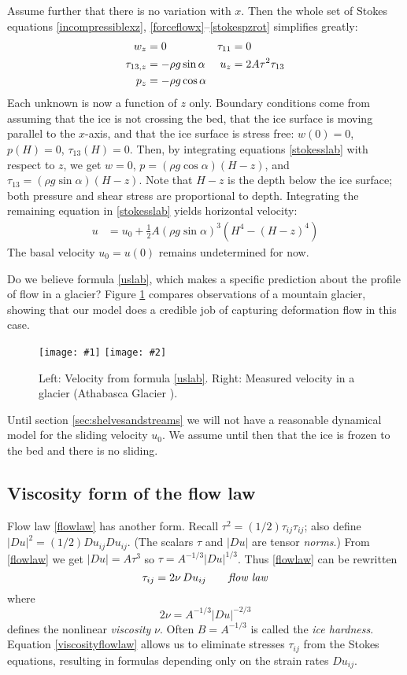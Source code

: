 \documentclass[letterpaper,final,12pt,reqno]{amsart}
\newcommand{\twofigsizes}[5]{
\begin{figure}[ht]
\centering
\texttt{[image: \#1]} \quad
\texttt{[image: \#2]}
\caption{#3}
\label{fig:#1}
\end{figure}}
\begin{document}
Assume further that there is no variation with $x$. Then the whole set of Stokes equations \eqref{incompressiblexz}, \eqref{forceflowx}--\eqref{stokespzrot} simplifies greatly:
\begin{align}
w_z &= 0 &   \tau_{11} &= 0 \label{stokesslab} \\
\tau_{13,z} &= - \rho g \sin\alpha &   u_z &= 2 A \tau^2 \tau_{13} \notag \\
p_z &= - \rho g \cos\alpha \notag
\end{align}
Each unknown is now a function of $z$ only.  Boundary conditions come from assuming that the ice is not crossing the bed, that the ice surface is moving parallel to the $x$-axis, and that the ice surface is stress free: $w(0)=0$, $p(H)=0$, $\tau_{13}(H)=0$.  Then, by integrating equations \eqref{stokesslab} with respect to $z$, we get $w=0$, $p = (\rho g \cos\alpha) (H-z)$, and $\tau_{13} = (\rho g \sin\alpha) (H-z)$.  Note that $H-z$ is the depth below the ice surface; both pressure and shear stress are proportional to depth.  Integrating the remaining equation in \eqref{stokesslab} yields horizontal velocity:
\begin{align}
u &= u_0 + \frac{1}{2} A (\rho g \sin\alpha)^3  \left(H^4 - (H-z)^4\right)  \label{uslab}
\end{align}
The basal velocity $u_0=u(0)$ remains undetermined for now.

Do we believe formula \eqref{uslab}, which makes a specific prediction about the profile of flow in a glacier?  Figure \ref{fig:slabvel} compares observations of a mountain glacier, showing that our model does a credible job of capturing deformation flow in this case.

\twofigsizes{slabvel}{athabasca-deform}{Left:  Velocity from formula \eqref{uslab}.  Right:  Measured velocity in a glacier (Athabasca Glacier \cite{SavagePaterson}).}{2.0in}{1.8in}

Until section \ref{sec:shelvesandstreams} we will not have a reasonable dynamical model for the sliding velocity $u_0$.  We assume until then that the ice is frozen to the bed and there is no sliding.


\subsection*{Viscosity form of the flow law}  Flow law \eqref{flowlaw} has another form.  Recall $\tau^2 = (1/2) \tau_{ij} \tau_{ij}$; also define $|Du|^2 = (1/2) Du_{ij} Du_{ij}$.  (The scalars $\tau$ and $|Du|$ are tensor \emph{norms}.)  From \eqref{flowlaw} we get $|Du| = A \tau^3$ so $\tau = A^{-1/3} |Du|^{1/3}$.  Thus \eqref{flowlaw} can be rewritten
\begin{equation}
\tau_{ij} = 2 \nu\, Du_{ij}  \qquad \text{\emph{flow law}} \label{viscosityflowlaw}
\end{equation}
where
    $$2\nu = A^{-1/3} |Du|^{-2/3}$$
defines the nonlinear \emph{viscosity} $\nu$.  Often $B = A^{-1/3}$ is called the \emph{ice hardness}.  Equation \eqref{viscosityflowlaw} allows us to eliminate stresses $\tau_{ij}$ from the Stokes equations, resulting in formulas depending only on the strain rates $Du_{ij}$.
\end{document}

